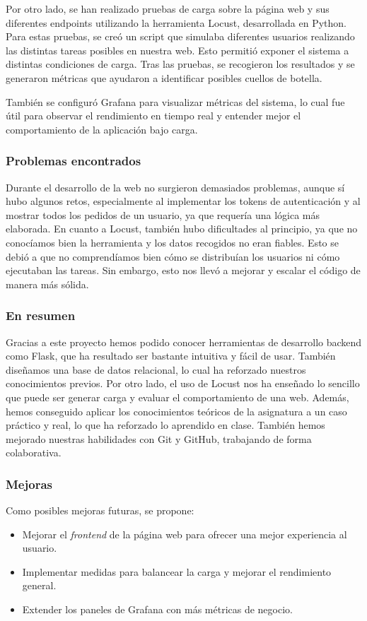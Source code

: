 \documentclass[10pt]{book}
\begin{document}
Por otro lado, se han realizado pruebas de carga sobre la página web y sus diferentes endpoints utilizando la herramienta Locust, desarrollada en Python. Para estas pruebas, se creó un script que simulaba diferentes usuarios realizando las distintas tareas posibles en nuestra web. Esto permitió exponer el sistema a distintas condiciones de carga. Tras las pruebas, se recogieron los resultados y se generaron métricas que ayudaron a identificar posibles cuellos de botella.

También se configuró Grafana para visualizar métricas del sistema, lo cual fue útil para observar el rendimiento en tiempo real y entender mejor el comportamiento de la aplicación bajo carga.

\subsubsection*{Problemas encontrados}
Durante el desarrollo de la web no surgieron demasiados problemas, aunque sí hubo algunos retos, especialmente al implementar los tokens de autenticación y al mostrar todos los pedidos de un usuario, ya que requería una lógica más elaborada. En cuanto a Locust, también hubo dificultades al principio, ya que no conocíamos bien la herramienta y los datos recogidos no eran fiables. Esto se debió a que no comprendíamos bien cómo se distribuían los usuarios ni cómo ejecutaban las tareas. Sin embargo, esto nos llevó a mejorar y escalar el código de manera más sólida.

\subsubsection*{En resumen}
Gracias a este proyecto hemos podido conocer herramientas de desarrollo backend como Flask, que ha resultado ser bastante intuitiva y fácil de usar. También diseñamos una base de datos relacional, lo cual ha reforzado nuestros conocimientos previos. Por otro lado, el uso de Locust nos ha enseñado lo sencillo que puede ser generar carga y evaluar el comportamiento de una web. Además, hemos conseguido aplicar los conocimientos teóricos de la asignatura a un caso práctico y real, lo que ha reforzado lo aprendido en clase. También hemos mejorado nuestras habilidades con Git y GitHub, trabajando de forma colaborativa.

\subsubsection*{Mejoras}
Como posibles mejoras futuras, se propone:
\begin{itemize}
    \item Mejorar el \textit{frontend} de la página web para ofrecer una mejor experiencia al usuario.
    \item Implementar medidas para balancear la carga y mejorar el rendimiento general.
    \item Extender los paneles de Grafana con más métricas de negocio.
\end{itemize}
\end{document}
